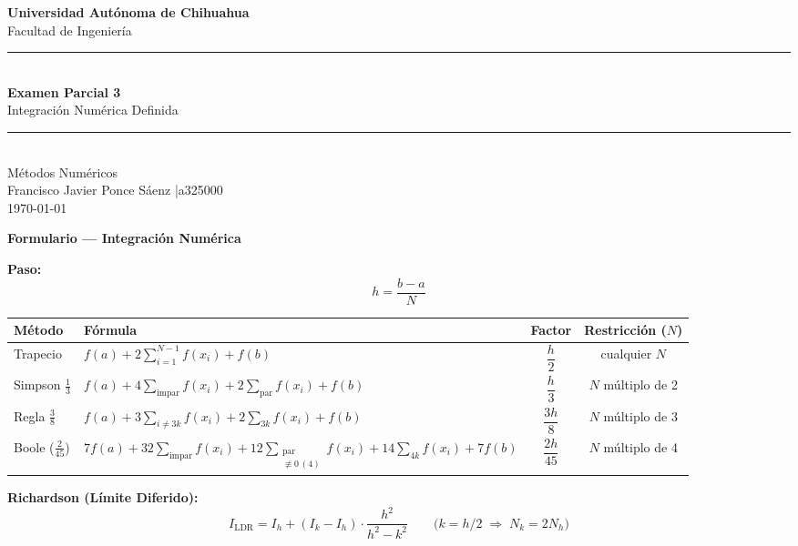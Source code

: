 \documentclass[12pt,letterpaper]{article}
\begin{document}

\begin{center}
  {\large\bfseries Universidad Autónoma de Chihuahua}\\[2pt]
  {\large Facultad de Ingeniería}\\[6pt]
  \rule{\linewidth}{0.8pt}\\[4pt]
  {\LARGE\bfseries Examen Parcial 3}\\[4pt]
  {\large Integración Numérica Definida}\\[4pt]
  \rule{\linewidth}{0.8pt}\\[6pt]
  {\large Métodos Numéricos}\\[4pt]
  {\large Francisco Javier Ponce Sáenz \quad|\quad a325000}\\[2pt]
  {\large\today}
\end{center}

\vspace{8pt}

\begin{mdframed}[linecolor=azulmetodo, linewidth=1.2pt, backgroundcolor=blue!4,
                  innertopmargin=8pt, innerbottommargin=8pt]
\noindent\textbf{\textcolor{azulmetodo}{Formulario — Integración Numérica}}
\vspace{4pt}

\textbf{Paso:}
\[
  h = \frac{b - a}{N}
\]

\begin{center}
\begin{tabular}{llcc}
  \toprule
  Método & Fórmula & Factor & Restricción ($N$) \\
  \midrule
  Trapecio
    & $f(a) + 2\displaystyle\sum_{i=1}^{N-1}f(x_i) + f(b)$
    & $\dfrac{h}{2}$ & cualquier $N$ \\[8pt]
  Simpson $\tfrac{1}{3}$
    & $f(a) + 4\displaystyle\sum_{\text{impar}}f(x_i) + 2\displaystyle\sum_{\text{par}}f(x_i) + f(b)$
    & $\dfrac{h}{3}$ & $N$ múltiplo de 2 \\[8pt]
  Regla $\tfrac{3}{8}$
    & $f(a) + 3\displaystyle\sum_{i\neq 3k}f(x_i) + 2\displaystyle\sum_{3k}f(x_i) + f(b)$
    & $\dfrac{3h}{8}$ & $N$ múltiplo de 3 \\[8pt]
  Boole ($\tfrac{2}{45}$)
    & $7f(a) + 32\displaystyle\sum_{\text{impar}}f(x_i) + 12\displaystyle\sum_{\substack{\text{par}\\{\not\equiv 0\,(4)}}}f(x_i) + 14\displaystyle\sum_{4k}f(x_i) + 7f(b)$
    & $\dfrac{2h}{45}$ & $N$ múltiplo de 4 \\[8pt]
  \bottomrule
\end{tabular}
\end{center}

\textbf{Richardson (Límite Diferido):}
\[
  I_{\text{LDR}} = I_h + (I_k - I_h)\cdot\frac{h^2}{h^2 - k^2}
  \qquad \bigl(k = h/2 \;\Rightarrow\; N_k = 2N_h\bigr)
\]
\end{mdframed}
\end{document}
